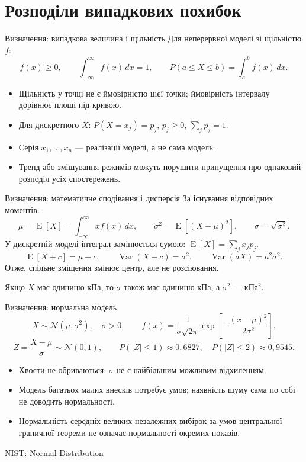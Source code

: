 \documentclass[aspectratio=169,11pt]{beamer}
\newcommand{\src}[2]{\par\vfill{\tiny\href{#1}{#2}}}
\newcommand{\E}{\operatorname{E}}
\newcommand{\Var}{\operatorname{Var}}
\begin{document}
\section{Розподіли випадкових похибок}
\begin{frame}{Визначення: випадкова величина і щільність}
Для неперервної моделі зі щільністю $f$:
\[
f(x)\ge0,\qquad \int_{-\infty}^{\infty}f(x)\,dx=1,
\qquad P(a\le X\le b)=\int_a^b f(x)\,dx.
\]
\begin{itemize}
\item Щільність у точці не є ймовірністю цієї точки; ймовірність інтервалу дорівнює площі під кривою.
\item Для дискретного $X$: $P(X=x_j)=p_j$, $p_j\ge0$, $\sum_jp_j=1$.
\item Серія $x_1,\ldots,x_n$ — реалізації моделі, а не сама модель.
\item Тренд або змішування режимів можуть порушити припущення про однаковий розподіл усіх спостережень.
\end{itemize}
\end{frame}

\begin{frame}{Визначення: математичне сподівання і дисперсія}
За існування відповідних моментів:
\[
\mu=\E[X]=\int_{-\infty}^{\infty}x f(x)\,dx,\qquad
\sigma^2=\E[(X-\mu)^2],\qquad \sigma=\sqrt{\sigma^2}.
\]
У дискретній моделі інтеграл замінюється сумою: $\E[X]=\sum_jx_jp_j$.
\[
\E[X+c]=\mu+c,\qquad \Var(X+c)=\sigma^2,
\qquad \Var(aX)=a^2\sigma^2.
\]
Отже, спільне зміщення змінює центр, але не розсіювання.
\medskip

Якщо $X$ має одиницю кПа, то $\sigma$ також має одиницю кПа, а $\sigma^2$ — кПа$^2$.
\end{frame}

\begin{frame}{Визначення: нормальна модель}
\[
X\sim\mathcal N(\mu,\sigma^2),\quad \sigma>0,\qquad
f(x)=\frac{1}{\sigma\sqrt{2\pi}}
\exp\!\left[-\frac{(x-\mu)^2}{2\sigma^2}\right].
\]
\[
Z=\frac{X-\mu}{\sigma}\sim\mathcal N(0,1),\qquad
P(|Z|\le1)\approx0{,}6827,\quad P(|Z|\le2)\approx0{,}9545.
\]
\begin{itemize}
\item Хвости не обриваються: $\sigma$ не є найбільшим можливим відхиленням.
\item Модель багатьох малих внесків потребує умов; наявність шуму сама по собі не доводить нормальності.
\item Нормальність середніх великих незалежних вибірок за умов центральної граничної теореми не означає нормальності окремих показів.
\end{itemize}
\src{https://www.itl.nist.gov/div898/handbook/eda/section3/eda3661.htm}{NIST: Normal Distribution}
\end{frame}
\end{document}
